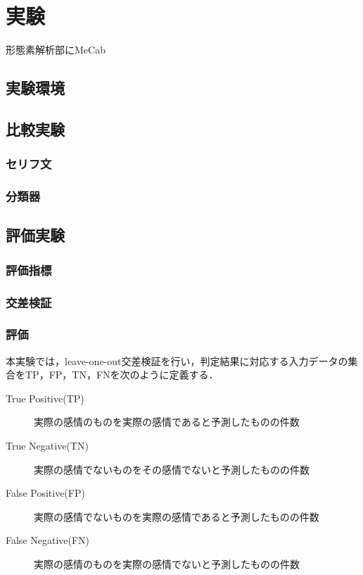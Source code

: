 \chapter{実験}

形態素解析部にMeCab\cite{mecab}

\section{実験環境}

\section{比較実験}
\subsection{セリフ文}
\subsection{分類器}
\section{評価実験}
\subsection{評価指標}
\subsection{交差検証}



\subsection{評価}
本実験では，leave-one-out交差検証を行い，判定結果に対応する入力データの集合をTP，FP，TN，FNを次のように定義する．

\begin{description}
   \item[True Positive(TP)] 実際の感情のものを実際の感情であると予測したものの件数
   \item[True Negative(TN)] 実際の感情でないものをその感情でないと予測したものの件数
   \item[False Positive(FP)] 実際の感情でないものを実際の感情であると予測したものの件数
   \item[False Negative(FN)] 実際の感情のものを実際の感情でないと予測したものの件数
 \end{description}


